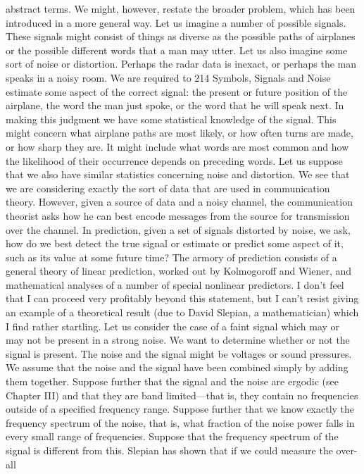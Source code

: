 {{{{{{{{{{{abstract terms. We might, however, restate the broader problem,
which has been introduced in a more general way.
Let us imagine a number of possible signals. These signals might
consist of things as diverse as the possible paths of airplanes or the
possible different words that a man may utter. Let us also imagine
some sort of noise or distortion. Perhaps the radar data is inexact,
or perhaps the man speaks in a noisy room. We are required to
214
Symbols, Signals and Noise
estimate some aspect of the correct signal: the present or future
position of the airplane, the word the man just spoke, or the word
that he will speak next. In making this judgment we have some
statistical knowledge of the signal. This might concern what airplane
paths are most likely, or how often turns are made, or how
sharp they are. It might include what words are most common and
how the likelihood of their occurrence depends on preceding words.
Let us suppose that we also have similar statistics concerning noise
and distortion.
We see that we are considering exactly the sort of data that are
used in communication theory. However, given a source of data
and a noisy channel, the communication theorist asks how he can
best encode messages from the source for transmission over the
channel. In prediction, given a set of signals distorted by noise, we
ask, how do we best detect the true signal or estimate or predict
some aspect of it, such as its value at some future time?
The armory of prediction consists of a general theory of linear
prediction, worked out by Kolmogoroff and Wiener, and mathematical
analyses of a number of special nonlinear predictors. I
don’t feel that I can proceed very profitably beyond this statement,
but I can’t resist giving an example of a theoretical result (due to
David Slepian, a mathematician) which I find rather startling.
Let us consider the case of a faint signal which may or may not
be present in a strong noise. We want to determine whether or not
the signal is present. The noise and the signal might be voltages
or sound pressures. We assume that the noise and the signal have
been combined simply by adding them together. Suppose further
that the signal and the noise are ergodic (see Chapter III) and that
they are band limited—that is, they contain no frequencies outside
of a specified frequency range. Suppose further that we know
exactly the frequency spectrum of the noise, that is, what fraction
of the noise power falls in every small range of frequencies.
Suppose that the frequency spectrum of the signal is different
from this. Slepian has shown that if we could measure the over-all
}}}}}}}}}}}

